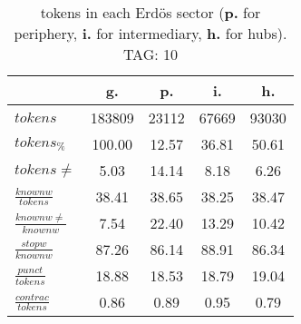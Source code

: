 \begin{table}[h!]
\begin{center}
\begin{tabular}{| l | c | c | c | c |}\hline
 & g. & p. & i. & h. \\\hline
$tokens$ & 183809  & 23112  & 67669  & 93030 \\\hline
$tokens_{\%}$ & 100.00  & 12.57  & 36.81  & 50.61 \\\hline
$tokens \neq$ & 5.03  & 14.14  & 8.18  & 6.26 \\\hline
$\frac{knownw}{tokens}$ & 38.41  & 38.65  & 38.25  & 38.47 \\\hline
$\frac{knownw \neq}{knownw}$ & 7.54  & 22.40  & 13.29  & 10.42 \\\hline
$\frac{stopw}{knownw}$ & 87.26  & 86.14  & 88.91  & 86.34 \\\hline
$\frac{punct}{tokens}$ & 18.88  & 18.53  & 18.79  & 19.04 \\\hline
$\frac{contrac}{tokens}$ & 0.86  & 0.89  & 0.95  & 0.79 \\\hline
\end{tabular}
\caption{tokens in each Erd\"os sector ({{\bf p.}} for periphery, {{\bf i.}} for intermediary, 
    {{\bf h.}} for hubs). TAG: 10}
\end{center}
\end{table}